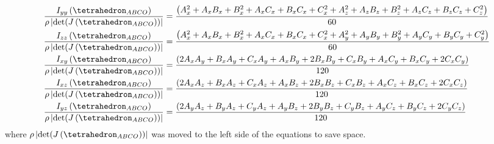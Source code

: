 \documentclass[oneside, a4paper]{book}
\newcommand\abs[1]{\left|#1\right|}
\newcommand\br[1]{\left(#1\right)}
\begin{document}
\begin{appendices}
\begin{align}
    \frac{I_{yy}\br{\tetrahedron_{ABCO}}}{\rho \abs{\det(J\br{\tetrahedron_{ABCO}})} } &= \frac{\br{
      A_x^2 + A_xB_x+B_x^2 + A_xC_x + B_xC_x + C_x^2 + 
      A_z^2 + A_zB_z+B_z^2 + A_zC_z + B_zC_z + C_z^2
    }}{60}\\
    \frac{I_{zz}\br{\tetrahedron_{ABCO}}}{\rho \abs{\det(J\br{\tetrahedron_{ABCO}})} } &= \frac{\br{
      A_x^2 + A_xB_x+B_x^2 + A_xC_x + B_xC_x + C_x^2 + 
      A_y^2 + A_yB_y+B_y^2 + A_yC_y + B_yC_y + C_y^2
    }}{60}\\
    \frac{I_{xy}\br{\tetrahedron_{ABCO}}}{\rho \abs{\det(J\br{\tetrahedron_{ABCO}})} } &= \frac{\br{
      2A_xA_y + B_xA_y + C_xA_y + A_xB_y + 
      2B_xB_y + C_xB_y + A_xC_y + B_xC_y + 
      2C_xC_y 
    }}{120}\\
    \frac{I_{xz}\br{\tetrahedron_{ABCO}}}{\rho \abs{\det(J\br{\tetrahedron_{ABCO}})} } &= \frac{\br{
      2A_xA_z + B_xA_z + C_xA_z + A_xB_z + 
      2B_xB_z + C_xB_z + A_xC_z + B_xC_z + 
      2C_xC_z 
    }}{120}\\
    \frac{I_{yz}\br{\tetrahedron_{ABCO}}}{\rho \abs{\det(J\br{\tetrahedron_{ABCO}})} } &= \frac{\br{
      2A_yA_z + B_yA_z + C_yA_z + A_yB_z + 
      2B_yB_z + C_yB_z + A_yC_z + B_yC_z + 
      2C_yC_z 
    }}{120}
  \end{align}
  where $\rho \abs{\det(J\br{\tetrahedron_{ABCO}})} $ was moved to the left side of the equations to save space. 
  

\end{appendices}
\end{document}
